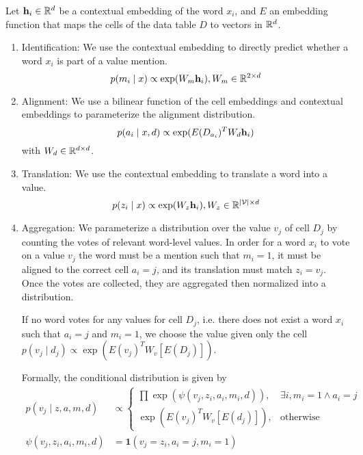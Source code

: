 \documentclass[12pt]{article}
\begin{document}
Let $\mathbf{h}_i \in \mathbb{R}^d$ be a contextual embedding of the word $x_i$,
and $E$ an embedding function that maps the cells of the data table $D$
to vectors in $\mathbb{R}^{d}$.
\begin{enumerate}
\item Identification: We use the contextual embedding to directly predict
whether a word $x_i$ is part of a value mention.
\begin{equation}
p(m_i \mid x) \propto \exp(W_m\mathbf{h}_i), W_m \in \mathbb{R}^{2 \times d}
\end{equation}
\item Alignment: We use a bilinear function of the cell embeddings and
contextual embeddings to parameterize the alignment distribution.
\begin{equation}
p(a_i \mid x,d) \propto \exp(E(D_{a_i})^T W_d \mathbf{h}_i)\\
\end{equation}
with $W_d \in \mathbb{R}^{d \times d}$.
\item Translation: We use the contextual embedding to translate a word
into a value.
\begin{equation}
p(z_i \mid x) \propto \exp(W_z \mathbf{h}_i), W_z \in \mathbb{R}^{|\mathcal{V}| \times d}
\end{equation}
\item Aggregation:
We parameterize a distribution over the value $v_j$ of cell $D_j$
by counting the votes of relevant word-level values.
In order for a word $x_i$ to vote on a value $v_j$
the word must be a mention such that $m_i = 1$,
it must be aligned to the correct cell $a_i = j$,
and its translation must match $z_i = v_j$.
Once the votes are collected,
they are aggregated then normalized into a distribution.

If no word votes for any values for cell $D_j$, i.e. there does not exist
a word $x_i$ such that $a_i = j$ and $m_i = 1$,
we choose the value given only the cell
$p(v_j \mid d_j) \propto \exp(E(v_j)^TW_v [E(D_j)])$.

Formally, the conditional distribution is given by
\begin{align}
p(v_j \mid z,a,m,d) &\propto \begin{cases}
    \prod \exp(\psi(v_j, z_i,a_i,m_i,d)),  & \exists i, m_i = 1 \wedge a_i = j\\
    \exp(E(v_j)^TW_v [E(d_j)]), & \textrm{otherwise}
\end{cases}\\
\psi(v_j, z_i, a_i, m_i,d) &= \mathbf{1}(v_j = z_i, a_i = j, m_i=1)%
\end{align}
\end{enumerate}
\end{document}

